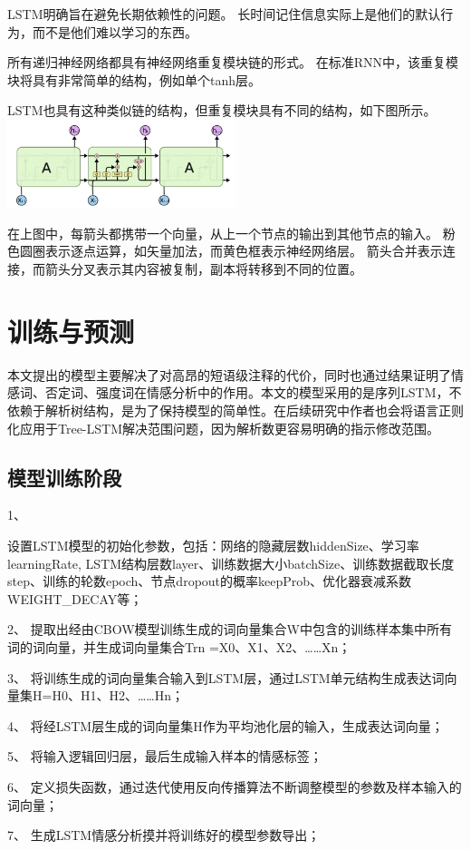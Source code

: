 \documentclass[twocolumn]{ctexart}
\begin{document}
\par LSTM明确旨在避免长期依赖性的问题。 长时间记住信息实际上是他们的默认行为，而不是他们难以学习的东西。

\par 所有递归神经网络都具有神经网络重复模块链的形式。 在标准RNN中，该重复模块将具有非常简单的结构，例如单个tanh层。

\par LSTM也具有这种类似链的结构，但重复模块具有不同的结构，如下图所示。
\includegraphics[width=0.5\textwidth]{p3.png}

\par 在上图中，每箭头都携带一个向量，从上一个节点的输出到其他节点的输入。 粉色圆圈表示逐点运算，如矢量加法，而黄色框表示神经网络层。 箭头合并表示连接，而箭头分叉表示其内容被复制，副本将转移到不同的位置。




\section{训练与预测}
本文提出的模型主要解决了对高昂的短语级注释的代价，同时也通过结果证明了情感词、否定词、强度词在情感分析中的作用。本文的模型采用的是序列LSTM，不依赖于解析树结构，是为了保持模型的简单性。在后续研究中作者也会将语言正则化应用于Tree-LSTM解决范围问题，因为解析数更容易明确的指示修改范围。
\subsection{模型训练阶段}
\par 1、

设置LSTM模型的初始化参数，包括：网络的隐藏层数hiddenSize、学习率learningRate, LSTM结构层数layer、训练数据大小batchSize、训练数据截取长度step、训练的轮数epoch、节点dropout的概率keepProb、优化器衰减系数WEIGHT_DECAY等；
\par 2、
提取出经由CBOW模型训练生成的词向量集合W中包含的训练样本集中所有词的词向量，并生成词向量集合Trn ={X0、X1、X2、……Xn}；

\par 3、
将训练生成的词向量集合输入到LSTM层，通过LSTM单元结构生成表达词向量集H={H0、H1、H2、……Hn}；
\par 4、
将经LSTM层生成的词向量集H作为平均池化层的输入，生成表达词向量；
\par 5、
将输入逻辑回归层，最后生成输入样本的情感标签；
\par 6、
定义损失函数，通过迭代使用反向传播算法不断调整模型的参数及样本输入的词向量；
\par 7、
生成LSTM情感分析摸并将训练好的模型参数导出；
\end{document}
